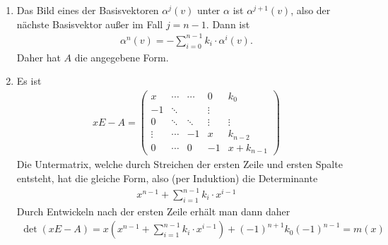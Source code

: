 \begin{mysatz}
\begin{enumerate}
            \begin{align*}
                0 & = \alpha^r(v) + \sum\limits_{i = 0}^{r - 1} k_i \cdot \alpha^i (v) = pv
                \intertext{mit}
                p(x) & = x^r + \sum\limits_{i = 0}^{r - 1} k_i \cdot x^i
            \end{align*}
            und nach Wahl von $r$ ist $p$ das normierte Polynom kleinsten Grades, welches $v$ annulliert.
            Es annulliert dann aber auch alle $\alpha^j (v)$, also auch deren Erzeugnis, d.h. ganz $V$.
            Daher ist $p = m$, insbesondere $\deg m = r$.
            Per Induktion sieht man leicht, dass sich mit $\alpha^r (v)$ auch jedes $\alpha^s (v)$ für $s \geq r$ als Linearkombination von $\left\{ v,\alpha(v),\ldots,\alpha^{r-1}(v)\right\}$ schreiben lässt.
            Diese Menge ist also eine Basis von $V$, insbesondere ist $r = n$.

        \item Das Bild eines der Basisvektoren $\alpha^j (v)$ unter $\alpha$ ist $\alpha^{j+1}(v)$, also der nächste Basisvektor außer im Fall $j = n-1$. Dann ist
            \begin{align*}
                \alpha^n (v) = -\sum\limits_{i = 0}^{n - 1} k_i \cdot \alpha^i(v).
            \end{align*}
            Daher hat $A$ die angegebene Form.

        \item Es ist
            \begin{align*}
                xE-A =
                \begin{pmatrix}
                    x & \cdots & \cdots & 0 & k_0\\
                    -1 & \ddots & & \vdots &\\
                    0 & \ddots & \ddots & \vdots & \vdots\\
                    \vdots & \cdots & -1 & x & k_{n-2}\\
                    0 & \cdots & 0 & -1 & x + k_{n-1}
                \end{pmatrix}
            \end{align*}
            Die Untermatrix, welche durch Streichen der ersten Zeile und ersten Spalte entsteht, hat die gleiche Form, also (per Induktion) die Determinante
            \begin{align*}
                x^{n-1} + \sum\limits_{i=1}^{n-1} k_i \cdot x^{i-1}
            \end{align*}
            Durch Entwickeln nach der ersten Zeile erhält man dann daher
            \begin{align*}
                \det(xE - A) = x \left( x^{n-1} + \sum\limits_{i = 1}^{n - 1} k_i \cdot x^{i-1} \right) + (-1)^{n + 1} k_0 (-1)^{n-1} = m(x)
            \end{align*}


\end{enumerate}
\end{mysatz}
